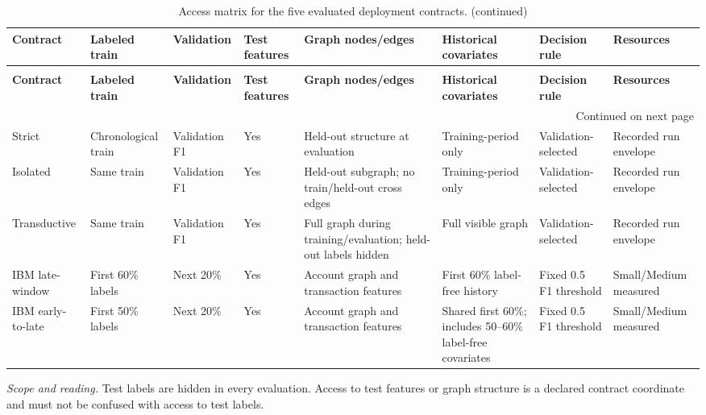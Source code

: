 \begingroup
\footnotesize
\setlength{\tabcolsep}{3pt}
\renewcommand{\arraystretch}{1.10}
\begin{longtable}{@{}p{} p{} p{} p{} p{} p{} p{} p{}@{}}
\caption{Access matrix for the five evaluated deployment contracts.}\label{tab:s-visibility-matrix}\\
\toprule
\textbf{Contract} & \textbf{Labeled train} & \textbf{Validation} & \textbf{Test features} & \textbf{Graph nodes/edges} & \textbf{Historical covariates} & \textbf{Decision rule} & \textbf{Resources} \\
\midrule
\endfirsthead
\caption[]{Access matrix for the five evaluated deployment contracts. (continued)}\\
\toprule
\textbf{Contract} & \textbf{Labeled train} & \textbf{Validation} & \textbf{Test features} & \textbf{Graph nodes/edges} & \textbf{Historical covariates} & \textbf{Decision rule} & \textbf{Resources} \\
\midrule
\endhead
\midrule
\multicolumn{8}{r}{\footnotesize Continued on next page}\\
\endfoot
\bottomrule
\endlastfoot
Strict & Chronological train & Validation F1 & Yes & Held-out structure at evaluation & Training-period only & Validation-selected & Recorded run envelope \\
Isolated & Same train & Validation F1 & Yes & Held-out subgraph; no train/held-out cross edges & Training-period only & Validation-selected & Recorded run envelope \\
Transductive & Same train & Validation F1 & Yes & Full graph during training/evaluation; held-out labels hidden & Full visible graph & Validation-selected & Recorded run envelope \\
IBM late-window & First 60\% labels & Next 20\% & Yes & Account graph and transaction features & First 60\% label-free history & Fixed 0.5 F1 threshold & Small/Medium measured \\
IBM early-to-late & First 50\% labels & Next 20\% & Yes & Account graph and transaction features & Shared first 60\%; includes 50--60\% label-free covariates & Fixed 0.5 F1 threshold & Small/Medium measured \\
\end{longtable}
\noindent\footnotesize\emph{Scope and reading.} Test labels are hidden in every evaluation. Access to test features or graph structure is a declared contract coordinate and must not be confused with access to test labels.\par
\endgroup
